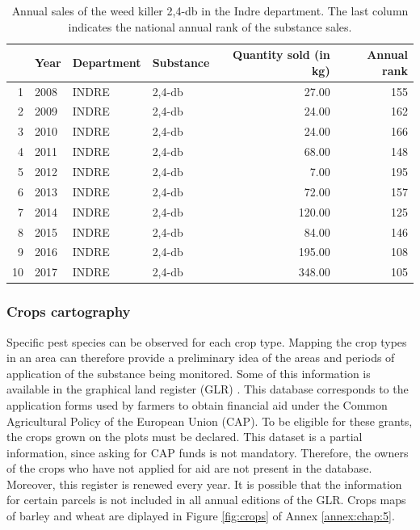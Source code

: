 \begin{table}[ht]\label{tab:bnvd}
\centering
\begin{tabular}{rlllrr}
  \hline
 & Year & Department & Substance & Quantity sold (in kg) & Annual rank \\ 
  \hline
1 & 2008 & INDRE & 2,4-db & 27.00 & 155 \\ 
  2 & 2009 & INDRE & 2,4-db & 24.00 & 162 \\ 
  3 & 2010 & INDRE & 2,4-db & 24.00 & 166 \\ 
  4 & 2011 & INDRE & 2,4-db & 68.00 & 148 \\ 
  5 & 2012 & INDRE & 2,4-db & 7.00 & 195 \\ 
  6 & 2013 & INDRE & 2,4-db & 72.00 & 157 \\ 
  7 & 2014 & INDRE & 2,4-db & 120.00 & 125 \\ 
  8 & 2015 & INDRE & 2,4-db & 84.00 & 146 \\ 
  9 & 2016 & INDRE & 2,4-db & 195.00 & 108 \\ 
  10 & 2017 & INDRE & 2,4-db & 348.00 & 105 \\ 
   \hline
\end{tabular}
   \caption{Annual sales of the weed killer 2,4-db in the Indre department. The last column indicates the national annual rank of the substance sales.}
\end{table}

\subsubsection{Crops cartography}

Specific pest species can be observed for each crop type. Mapping the crop types in an area can therefore provide a preliminary idea of the areas and periods of application of the substance being monitored. Some of this information is available in the graphical land register (GLR) \cite{RPG}. This database corresponds to the application forms used by farmers to obtain financial aid under the Common Agricultural Policy of the European Union (CAP). To be eligible for these grants, the crops grown on the plots must be declared. This dataset is a partial information, since asking for CAP funds is not mandatory. Therefore, the owners of the crops who have not applied for aid are not present in the database. Moreover, this register is renewed every year. It is possible that the information for certain parcels is not included in all annual editions of the GLR. Crops maps of barley and wheat are diplayed in Figure \ref{fig:crops} of Annex \ref{annex:chap:5}.

